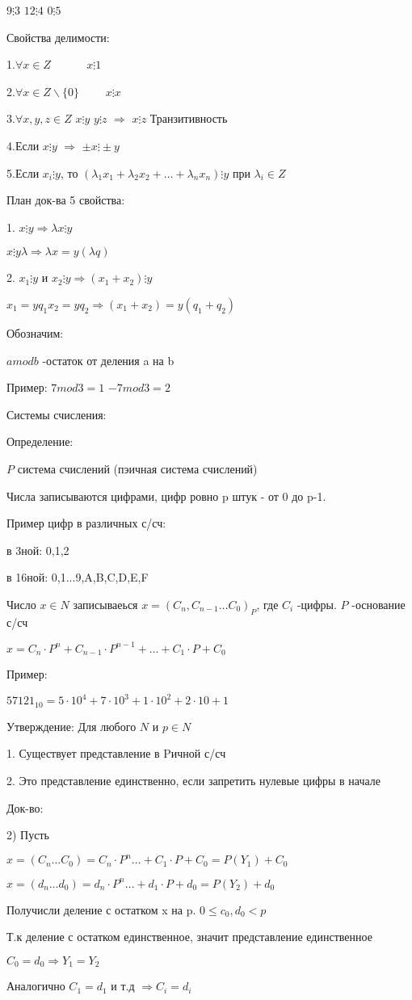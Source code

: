 \documentclass[a4paper,12pt]{article}
\begin{document}
$9 \vdots 3$ $12\vdots 4$ $0\vdots 5$

Свойства делимости:

1.$\forall x \in Z$ $ \hspace{30pt}$ $x\vdots 1$

2.$\forall x\in Z \backslash \{0\}$  $ \hspace{20pt}$ $x\vdots x$

3.$\forall x,y,z\in Z$ $x\vdots y $ $y\vdots z $ $ \Rightarrow $ $x\vdots z$ Транзитивность

4.Если $x\vdots y $ $\Rightarrow$ $\pm x\vdots \pm y$ 

5.Если $x_i\vdots y $, то $(\lambda_1x_1+\lambda_2x_2+\ldots +\lambda_n x_n)\vdots y$  при $\lambda_i \in Z$

План док-ва 5 свойства:

1. $x\vdots y \Rightarrow \lambda x\vdots y$

$x\vdots y\lambda \Rightarrow \lambda x=y(\lambda q)$

2. $x_1\vdots y$ и $x_2\vdots y \Rightarrow (x_1+x_2)\vdots y $

$x_1=yq_1 x_2=yq_2 \Rightarrow(x_1+x_2)=y(q_1+q_2)$

Обозначим:

$a mod b$ -остаток от деления a на b

Пример:
$7 mod 3=1$ $-7 mod 3=2$

Системы счисления:

Определение:

$P$ система счислений (пэичная система счислений)

Числа записываются цифрами, цифр ровно p штук - от 0 до p-1.

Пример цифр в различных с/сч:

в 3ной: 0,1,2

в 16ной: 0,1...9,A,B,C,D,E,F

Число $x\in N$ записываеься $x=(C_n,C_{n-1} \ldots C_0)_P$, где $C_i$ -цифры. $P$ -основание с/сч

$x=C_n\cdot P^n+C_{n-1} \cdot P^{n-1} +\ldots + C_1\cdot P+C_0$

Пример:

$57121_{10}=5\cdot10^4+7\cdot10^3+1\cdot10^2+2\cdot 10+1$

Утверждение: Для любого $N$ и $p\in N$

1. Существует представление в Pичной с/сч

2. Это представление единственно, если запретить нулевые цифры в начале

Док-во:

2) Пусть

$x=(C_n \ldots C_0) =C_n\cdot P^n \ldots +C_1\cdot P+C_0=P(Y_1)+C_0$

$x=(d_n \ldots d_0) =d_n\cdot P^n \ldots +d_1\cdot P+d_0=P(Y_2)+d_0$

Получисли деление с остатком x на p.  $0\leq  c_0,d_0<p$

Т.к деление с остатком единственное, значит представление единственное

$C_0=d_0 \Rightarrow Y_1=Y_2$

Аналогично $C_1=d_1$ и т.д $\Rightarrow C_i=d_i$
\end{document}

